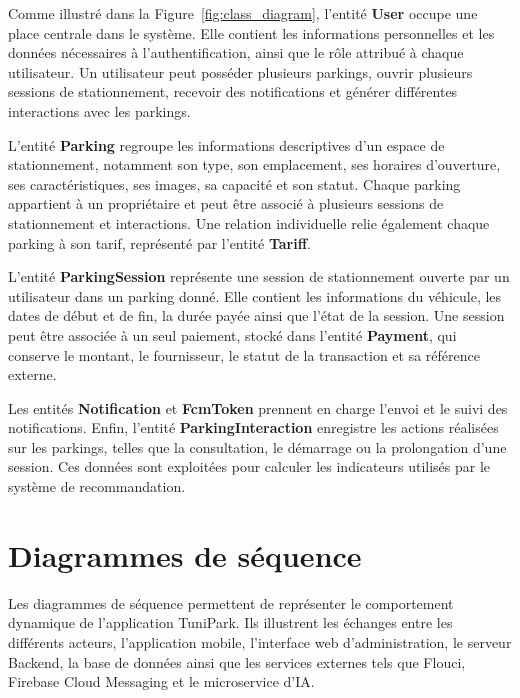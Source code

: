 \par Comme illustré dans la Figure~\ref{fig:class_diagram}, l'entité \textbf{User} occupe une place centrale dans le système. Elle contient les informations personnelles et les données nécessaires à l'authentification, ainsi que le rôle attribué à chaque utilisateur. Un utilisateur peut posséder plusieurs parkings, ouvrir plusieurs sessions de stationnement, recevoir des notifications et générer différentes interactions avec les parkings.

\par L'entité \textbf{Parking} regroupe les informations descriptives d'un espace de stationnement, notamment son type, son emplacement, ses horaires d'ouverture, ses caractéristiques, ses images, sa capacité et son statut. Chaque parking appartient à un propriétaire et peut être associé à plusieurs sessions de stationnement et interactions. Une relation individuelle relie également chaque parking à son tarif, représenté par l'entité \textbf{Tariff}.

\par L'entité \textbf{ParkingSession} représente une session de stationnement ouverte par un utilisateur dans un parking donné. Elle contient les informations du véhicule, les dates de début et de fin, la durée payée ainsi que l'état de la session. Une session peut être associée à un seul paiement, stocké dans l'entité \textbf{Payment}, qui conserve le montant, le fournisseur, le statut de la transaction et sa référence externe.

\par Les entités \textbf{Notification} et \textbf{FcmToken} prennent en charge l'envoi et le suivi des notifications. Enfin, l'entité \textbf{ParkingInteraction} enregistre les actions réalisées sur les parkings, telles que la consultation, le démarrage ou la prolongation d'une session. Ces données sont exploitées pour calculer les indicateurs utilisés par le système de recommandation.

\section{Diagrammes de séquence}

\par Les diagrammes de séquence permettent de représenter le comportement dynamique de l'application TuniPark. Ils illustrent les échanges entre les différents acteurs, l'application mobile, l'interface web d'administration, le serveur Backend, la base de données ainsi que les services externes tels que Flouci, Firebase Cloud Messaging et le microservice d'IA.

